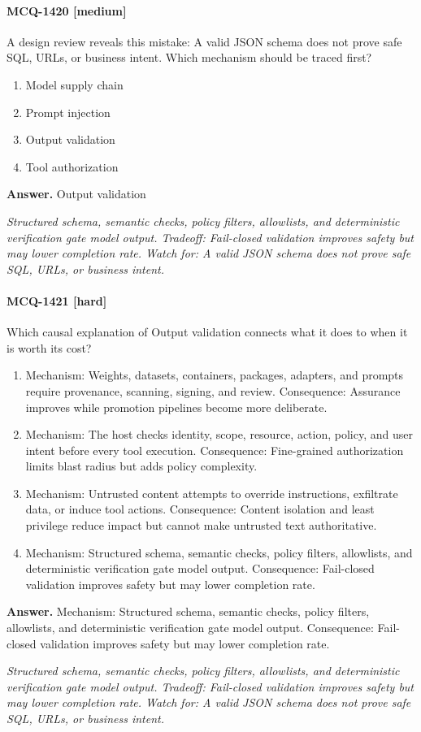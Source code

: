 \paragraph{MCQ-1420 [medium]} A design review reveals this mistake: A valid JSON schema does not prove safe SQL, URLs, or business intent. Which mechanism should be traced first?
\begin{enumerate}[label=\Alph*.]
\item Model supply chain
\item Prompt injection
\item Output validation
\item Tool authorization
\end{enumerate}
\noindent\textbf{Answer.} Output validation
\par\textit{Structured schema, semantic checks, policy filters, allowlists, and deterministic verification gate model output. Tradeoff: Fail-closed validation improves safety but may lower completion rate. Watch for: A valid JSON schema does not prove safe SQL, URLs, or business intent.}
\paragraph{MCQ-1421 [hard]} Which causal explanation of Output validation connects what it does to when it is worth its cost?
\begin{enumerate}[label=\Alph*.]
\item Mechanism: Weights, datasets, containers, packages, adapters, and prompts require provenance, scanning, signing, and review. Consequence: Assurance improves while promotion pipelines become more deliberate.
\item Mechanism: The host checks identity, scope, resource, action, policy, and user intent before every tool execution. Consequence: Fine-grained authorization limits blast radius but adds policy complexity.
\item Mechanism: Untrusted content attempts to override instructions, exfiltrate data, or induce tool actions. Consequence: Content isolation and least privilege reduce impact but cannot make untrusted text authoritative.
\item Mechanism: Structured schema, semantic checks, policy filters, allowlists, and deterministic verification gate model output. Consequence: Fail-closed validation improves safety but may lower completion rate.
\end{enumerate}
\noindent\textbf{Answer.} Mechanism: Structured schema, semantic checks, policy filters, allowlists, and deterministic verification gate model output. Consequence: Fail-closed validation improves safety but may lower completion rate.
\par\textit{Structured schema, semantic checks, policy filters, allowlists, and deterministic verification gate model output. Tradeoff: Fail-closed validation improves safety but may lower completion rate. Watch for: A valid JSON schema does not prove safe SQL, URLs, or business intent.}
